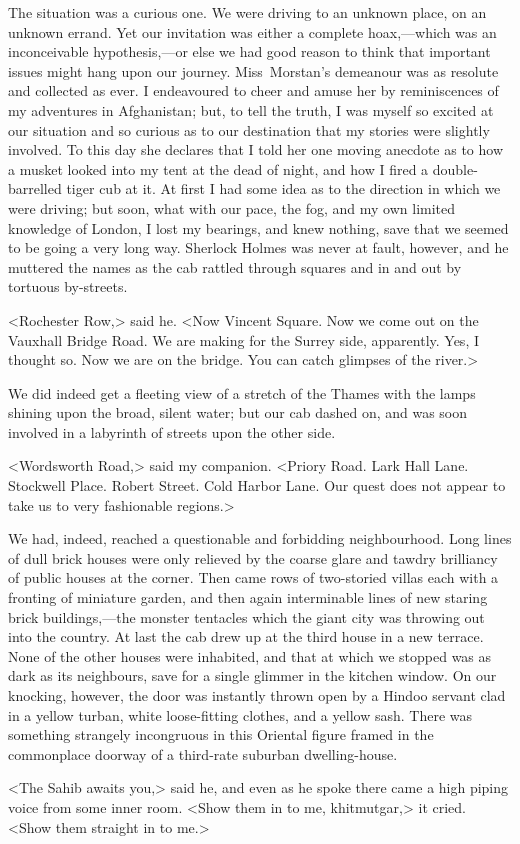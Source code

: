 The situation was a curious one. We were driving to an unknown place, on an unknown errand. Yet our invitation was either a complete hoax,—which was an inconceivable hypothesis,—or else we had good reason to think that important issues might hang upon our journey. Miss~Morstan's demeanour was as resolute and collected as ever. I endeavoured to cheer and amuse her by reminiscences of my adventures in Afghanistan; but, to tell the truth, I was myself so excited at our situation and so curious as to our destination that my stories were slightly involved. To this day she declares that I told her one moving anecdote as to how a musket looked into my tent at the dead of night, and how I fired a double-barrelled tiger cub at it. At first I had some idea as to the direction in which we were driving; but soon, what with our pace, the fog, and my own limited knowledge of London, I lost my bearings, and knew nothing, save that we seemed to be going a very long way. Sherlock Holmes was never at fault, however, and he muttered the names as the cab rattled through squares and in and out by tortuous by-streets.

<Rochester Row,> said he. <Now Vincent Square. Now we come out on the Vauxhall Bridge Road. We are making for the Surrey side, apparently. Yes, I thought so. Now we are on the bridge. You can catch glimpses of the river.>

We did indeed get a fleeting view of a stretch of the Thames with the lamps shining upon the broad, silent water; but our cab dashed on, and was soon involved in a labyrinth of streets upon the other side.

<Wordsworth Road,> said my companion. <Priory Road. Lark Hall Lane. Stockwell Place. Robert Street. Cold Harbor Lane. Our quest does not appear to take us to very fashionable regions.>

We had, indeed, reached a questionable and forbidding neighbourhood. Long lines of dull brick houses were only relieved by the coarse glare and tawdry brilliancy of public houses at the corner. Then came rows of two-storied villas each with a fronting of miniature garden, and then again interminable lines of new staring brick buildings,—the monster tentacles which the giant city was throwing out into the country. At last the cab drew up at the third house in a new terrace. None of the other houses were inhabited, and that at which we stopped was as dark as its neighbours, save for a single glimmer in the kitchen window. On our knocking, however, the door was instantly thrown open by a Hindoo servant clad in a yellow turban, white loose-fitting clothes, and a yellow sash. There was something strangely incongruous in this Oriental figure framed in the commonplace doorway of a third-rate suburban dwelling-house.

<The Sahib awaits you,> said he, and even as he spoke there came a high piping voice from some inner room. <Show them in to me, khitmutgar,> it cried. <Show them straight in to me.>